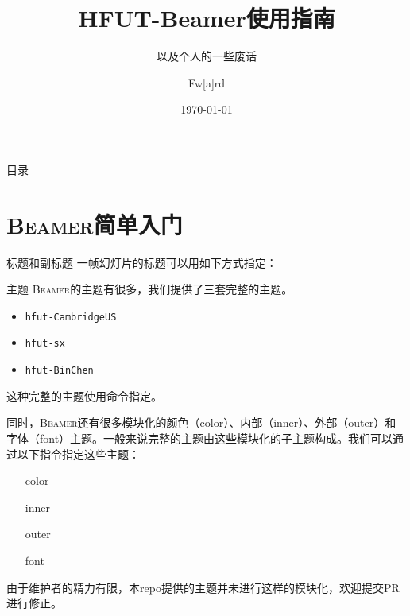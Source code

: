 \documentclass[aspectratio=169]{beamer}
\title{HFUT-Beamer使用指南}
\subtitle{以及个人的一些废话}
\author{Fw[a]rd}
\institute{HFUT \TeX{} User Group}
\date{\today}
\newcommand{\Beamer}{\textsc{Beamer}}
\newcommand{\enableindent}{\setlength{\parskip}{6pt}\setlength{\parindent}{2em}}
\begin{document}
\begin{frame}
	\maketitle
\end{frame}

\begin{frame}{目录}
	\tableofcontents
\end{frame}

\section{\Beamer{}简单入门}

\begin{frame}[fragile]{标题}{和副标题}
一帧幻灯片的标题可以用如下方式指定：

\end{frame}


\begin{frame}{主题}
	\enableindent
	\Beamer 的主题有很多，我们提供了三套完整的主题。
\begin{itemize}
	\item \texttt{hfut-CambridgeUS}
	\item \texttt{hfut-sx}
	\item \texttt{hfut-BinChen}
\end{itemize}

这种完整的主题使用\texttt{\usetheme}命令指定。

\framebreak

同时，\Beamer 还有很多模块化的颜色（color）、内部（inner）、外部（outer）和字体（font）主题。一般来说完整的主题由这些模块化的子主题构成。我们可以通过以下指令指定这些主题：
\begin{itemize}
	\item[color] \texttt{\usecolortheme}
	\item[inner] \texttt{\useinnertheme}
	\item[outer] \texttt{\useoutertheme}
	\item[font] \texttt{\usefonttheme}
\end{itemize}

由于维护者的精力有限，本repo提供的主题并未进行这样的模块化，欢迎提交PR进行修正。

\end{frame}
\end{document}

